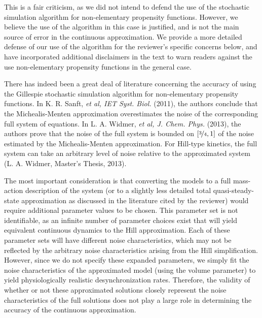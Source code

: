 \documentclass[11pt, letterpaper]{article}
\begin{document}
This is a fair criticism, as we did not intend to defend the use of the stochastic simulation algorithm for non-elementary propensity functions. 
However, we believe the use of the algorithm in this case is justified, and is not the main source of error in the continuous approximation.
We provide a more detailed defense of our use of the algorithm for the reviewer's specific concerns below, and have incorporated additional disclaimers in the text to warn readers against the use non-elementary propensity functions in the general case.

There has indeed been a great deal of literature concerning the accuracy of using the Gillespie stochastic simulation algorithm for non-elementary propensity functions.
In K. R. Sanft, {\itshape et al, IET Syst. Biol.} (2011), the authors conclude that the Michealis-Menten approximation overestimates the noise of the corresponding full system of equations.
In L. A. Widmer, {\itshape et al, J. Chem. Phys.} (2013), the authors prove that the noise of the full system is bounded on $[\nicefrac{3}{4}, 1]$ of the noise estimated by the Michealis-Menten approximation.
For Hill-type kinetics, the full system can take an arbitrary level of noise relative to the approximated system (L. A. Widmer, Master's Thesis, 2013).

The most important consideration is that converting the models to a full mass-action description of the system (or to a slightly less detailed total quasi-steady-state approximation as discussed in the literature cited by the reviewer) would require additional parameter values to be chosen.
This parameter set is not identifiable, as an infinite number of parameter choices exist that will yield equivalent continuous dynamics to the Hill approximation.
Each of these parameter sets will have different noise characteristics, which may not be reflected by the arbitrary noise characteristics arising from the Hill simplification.
However, since we do not specify these expanded parameters, we simply fit the noise characteristics of the approximated model (using the volume parameter) to yield physiologically realistic desynchronization rates.
Therefore, the validity of whether or not these approximated solutions closely represent the noise characteristics of the full solutions does not play a large role in determining the accuracy of the continuous approximation.
\end{document}
